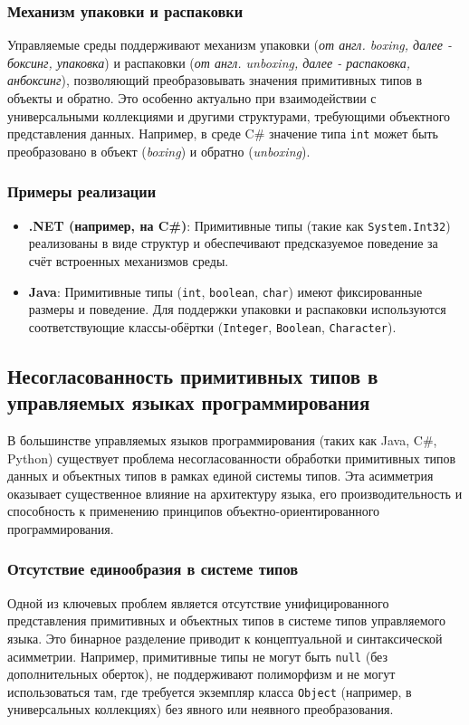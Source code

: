 \subsubsection*{Механизм упаковки и распаковки}
Управляемые среды поддерживают механизм упаковки (\textit{от англ. boxing, далее - боксинг, упаковка}) и распаковки (\textit{от англ. unboxing, далее - распаковка, анбоксинг}), позволяющий преобразовывать значения примитивных типов в объекты и обратно.
Это особенно актуально при взаимодействии с универсальными коллекциями и другими структурами, требующими объектного представления данных.
Например, в среде C\# значение типа \verb|int| может быть преобразовано в объект (\textit{boxing}) и обратно (\textit{unboxing}).

\subsubsection*{Примеры реализации}
\begin{itemize}
    \item \textbf{.NET (например, на C\#)}: Примитивные типы (такие как \verb|System.Int32|) реализованы в виде структур и обеспечивают предсказуемое поведение за счёт встроенных механизмов среды.
    \item \textbf{Java}: Примитивные типы (\verb|int|, \verb|boolean|, \verb|char|) имеют фиксированные размеры и поведение. Для поддержки упаковки и распаковки используются соответствующие классы-обёртки (\verb|Integer|, \verb|Boolean|, \verb|Character|).
\end{itemize}


\subsection{Несогласованность примитивных типов в управляемых языках программирования}

В большинстве управляемых языков программирования (таких как Java, C\#, Python) существует проблема несогласованности обработки примитивных типов данных и объектных типов в рамках единой системы типов. Эта асимметрия оказывает существенное влияние на архитектуру языка, его производительность и способность к применению принципов объектно-ориентированного программирования.

\subsubsection*{Отсутствие единообразия в системе типов}
Одной из ключевых проблем является отсутствие унифицированного представления примитивных и объектных типов в системе типов управляемого языка.
Это бинарное разделение приводит к концептуальной и синтаксической асимметрии. Например, примитивные типы не могут быть \texttt{null} (без дополнительных оберток), не поддерживают полиморфизм и не могут использоваться там, где требуется экземпляр класса \texttt{Object} (например, в универсальных коллекциях) без явного или неявного преобразования.


